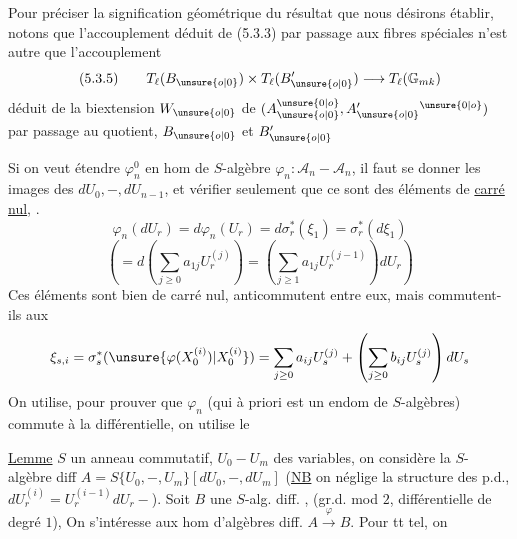 Pour préciser la signification géométrique du résultat que nous désirons établir, notons que l'accouplement déduit de (5.3.3) par passage aux fibres spéciales n'est autre que l'accouplement
\[
(5.3.5)\qquad T_\ell(B_{\unsure{o|0}})\times T_\ell(B'_{\unsure{o|0}})\longrightarrow T_\ell(\mathbb G_{mk})
\]
déduit de la biextension $W_{\unsure{o|0}}$ de $(A_{\unsure{o|0}}^{\unsure{0|o}},A'_{\unsure{o|0}}{}^{\unsure{0|o}})$ par passage au quotient, $B_{\unsure{o|0}}$ et $B'_{\unsure{o|0}}$

Si on veut étendre $\varphi_n^0$ en \deleted{$\unsure{\varphi}$} hom de $S$-algèbre $\varphi_n:\mathcal A_n-\mathcal A_n$, il faut se donner les images des $dU_0,-,dU_{n-1}$, et vérifier seulement que ce sont des éléments de \uline{carré nul},  .
\[
\varphi_n(dU_r)=d\varphi_n(U_r)=d\sigma_r^*(\xi_1)=\sigma_r^*(d\xi_1)
\]
\[
\left(=d\left(\sum_{j\geq0}a_{1j}U_r^{(j)}\right)
=\left(\sum_{j\geq1}a_{1j}U_r^{(j-1)}\right)dU_r\right)
\]
Ces éléments sont bien de carré nul, anticommutent entre eux, mais commutent-ils aux
\[
\xi_{s,i}=\sigma_s^*(\unsure{\varphi(X_0^{(i)})|X_0^{(i)}})
=\sum_{j\geq0}a_{ij}U_s^{(j)}+\left(\sum_{j\geq0}b_{ij}U_s^{(j)}\right)dU_s
\]
On utilise, pour prouver que $\varphi_n$ (qui à priori est un endom de $S$-algèbres) commute à la différentielle, on utilise le

\uline{Lemme} $S$ un anneau commutatif, $U_0- U_m$ des variables, on considère  la $S$-algèbre diff $A=S\{U_0,-,U_m\}[dU_0,-,dU_m]$
(\uline{NB} on néglige la structure des p.d.,  $dU_r^{(i)}=U_r^{(i-1)}dU_r-$).
Soit $B$ une $S$-alg. diff. , (gr.d. mod $2$, différentielle de degré $1$),
On s'intéresse aux hom d'algèbres diff. $A\xrightarrow{\varphi}B$. Pour tt tel, on

